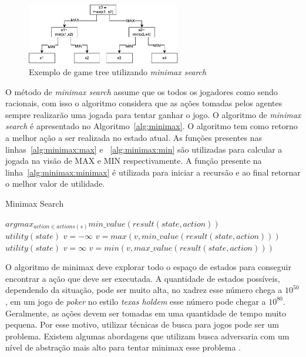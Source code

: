 \begin{figure}[ht]
	\centering
	\includegraphics[width=0.6\textwidth]{fig/gametree.pdf}
	\caption{Exemplo de game tree utilizando \textit{minimax search}}
	\label{fig:gametree}
\end{figure} 

O método de \textit{minimax search} assume que os todos os jogadores como sendo racionais, com isso o algoritmo considera que as ações tomadas pelos agentes sempre realizarão uma jogada para tentar ganhar o jogo. O algoritmo de \textit{minimax search} é apresentado no Algoritmo~\ref{alg:minimax}. O algoritmo tem como retorno a melhor ação a ser realizada no estado atual. As funções presentes nas linhas~\ref{alg:minimax:max} e ~\ref{alg:minimax:min} são utilizadas para calcular a jogada na visão de MAX e MIN respectivamente.
A função presente na linha~\ref{alg:minimax:minimax} é utilizada para iniciar a recursão e ao final retornar o melhor valor de utilidade.

\begin{algorithm}
	\caption{Minimax Search}
	\label{alg:minimax}
	\begin{algorithmic}[1]	
		 \label{alg:minimax:minimax}
		\State \Return $arg max_{action \in actions(s)} min\_value(result(state, action)) $
		\EndFunction \\
		\label{alg:minimax:max}
		\State	\Return $utility(state)$
		\EndIf
		\State $v = -\infty$
		\State $v = max(v, min\_value(result(state,action)))$
		\EndFor	
		\EndFunction \\
		\label{alg:minimax:min}
		\State	\Return $utility(state)$
		\EndIf
		\State $v = \infty$
		\State $v = min(v, max\_value(result(state,action)))$
		\EndFor	
		\EndFunction
	\end{algorithmic}
\end{algorithm}

O algoritmo de minimax deve explorar todo o espaço de estados para conseguir encontrar a ação que deve ser executada. A quantidade de estados possíveis, dependendo da situação, pode ser muito alta, no xadrez esse número chega a $10^{50}$, em um jogo de \textit{poker} no estilo \textit{texas holdem} esse número pode chegar a $10^{80}$. Geralmente, as ações devem ser tomadas em uma quantidade de tempo muito pequena. Por esse motivo, utilizar técnicas de busca para jogos pode ser um problema. Existem algumas abordagens que utilizam busca adversaria com um nível de abstração mais alto para tentar minimax esse problema \cite{ontanon2013survey}.  

